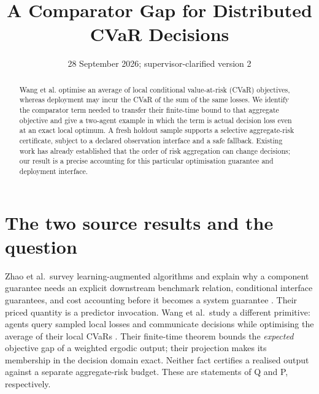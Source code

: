 \documentclass{article}
\title{A Comparator Gap for Distributed CVaR Decisions}
\date{28 September 2026; supervisor-clarified version 2}
\begin{document}
\maketitle

\begin{abstract}
Wang et al. optimise an average of local conditional value-at-risk
(CVaR) objectives, whereas deployment may incur the CVaR of the sum of
the same losses.  We identify the comparator term needed to transfer
their finite-time bound to that aggregate objective and give a two-agent
example in which the term is actual decision loss even at an exact local
optimum.  A fresh holdout sample supports a selective aggregate-risk
certificate, subject to a declared observation interface and a safe
fallback.  Existing work has already established that the order of risk
aggregation can change decisions; our result is a precise accounting for
this particular optimisation guarantee and deployment interface.
\end{abstract}

\section{The two source results and the question}

Zhao et al.\ survey learning-augmented algorithms and explain why a
component guarantee needs an explicit downstream benchmark relation,
conditional interface guarantees, and cost accounting before it becomes
a system guarantee \cite{Q}.  Their priced quantity is a predictor
invocation.  Wang et al.\ study a different primitive: agents query
sampled local losses and communicate decisions while optimising the
average of their local CVaRs \cite{P}.  Their finite-time theorem bounds
the \emph{expected} objective gap of a weighted ergodic output; their
projection makes its membership in the decision domain exact.  Neither
fact certifies a realised output against a separate aggregate-risk
budget.  These are statements of Q and P, respectively.
\end{document}
